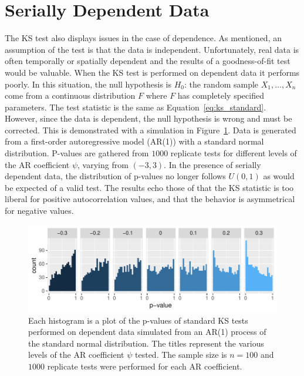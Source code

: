 \documentclass[12pt, letterpaper, titlepage]{article}
\begin{document}
\section{Serially Dependent Data}
\label{sec:dependence}

The KS test also displays issues in the case of dependence. As mentioned, an 
assumption of the test is that the data is independent. Unfortunately, real data
is often temporally or spatially dependent and the results of a goodness-of-fit 
test would be valuable. When the KS test is performed on dependent data it 
performs poorly. In this situation, the null hypothesis is $H_0$: the random 
sample $X_1, \ldots, X_n$ come from a continuous distribution $F$ where $F$ has 
completely specified parameters. The test statistic is the same as 
Equation~\eqref{eq:ks_standard}. However, since the data is dependent, the null 
hypothesis is wrong and must be corrected. This is demonstrated with a 
simulation in Figure~\ref{fig:hist_correlation}. Data is generated from a 
first-order autoregressive model (AR(1)) with a standard normal distribution. 
P-values are gathered from $1000$ replicate tests for different levels of the 
AR coefficient $\psi$, varying from $(-3,3)$. In the presence of serially 
dependent data, the distribution of p-values no longer follows $U(0, 1)$ as 
would be expected of a valid test. The results echo those of \citet{Durilleul} 
that the KS statistic is too liberal for positive autocorrelation values, and 
that the behavior is asymmetrical for negative values.

\begin{figure}[tbp]
  \centering
  \includegraphics{hist_correlation}
  \caption{Each histogram is a plot of the p-values of standard KS tests
  performed on dependent data simulated from an AR(1) process of the standard 
  normal distribution. The titles represent the various levels of the AR 
  coefficient $\psi$ tested. The sample size is $n = 100$ and $1000$ replicate 
  tests were performed for each AR coefficient.}
  \label{fig:hist_correlation}
\end{figure}
\end{document}
